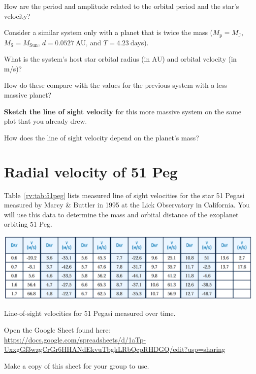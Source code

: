 \begin{steps}
	\item How are the period and amplitude related to the orbital period and the star’s velocity?
\end{steps}

Consider a similar system only with a planet that is twice the mass ($M_\textrm{p} = M_\textrm{J}$, $M_\textrm{S} = M_\textrm{Sun}$, $d = 0.0527\:$AU, and $T = 4.23\:$days).

\begin{steps}
	\item What is the system's host star orbital radius (in AU) and orbital velocity (in m/s)?
	
	\item How do these compare with the values for the previous system with a less massive planet?

	\item \textbf{Sketch the line of sight velocity} for this more massive system on the same plot that you already drew.

	\item How does the line of sight velocity depend on the planet’s mass?
\end{steps}

\section{Radial velocity of 51 Peg}

Table~\ref{rv:tab:51peg} lists measured line of sight velocities for the star 51 Pegasi measured by Marcy \& Buttler in 1995 at the Lick Observatory in California. You will use this data to determine the mass and orbital distance of the exoplanet orbiting 51 Peg.

\begin{table}
	\centering
	\includegraphics[width=\textwidth]{radial-velocity/51-peg-velocities}
	\caption{Line-of-sight velocities for 51 Pegasi measured over time.}\label{rv:tab:51peg}
\end{table}

\begin{steps}
	\item Open the Google Sheet found here: \url{https://docs.google.com/spreadsheets/d/1aTp-UxxgGf3wzgCrGr6HHANdEkvuTbgkLRbQcpRHDGQ/edit?usp=sharing}
	
	\item Make a copy of this sheet for your group to use.
\end{steps}

